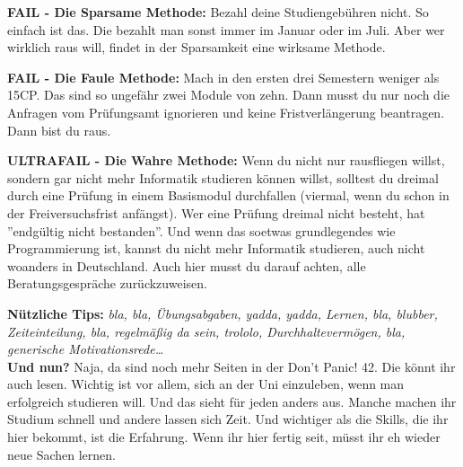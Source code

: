 \textbf{FAIL - Die Sparsame Methode:}
Bezahl deine Studiengeb\"uhren nicht. So einfach ist das. Die bezahlt man sonst immer im Januar oder im Juli. Aber wer wirklich raus will, findet in der Sparsamkeit eine wirksame Methode.

\textbf{FAIL - Die Faule Methode:}
Mach in den ersten drei Semestern weniger als 15CP. Das sind so ungef\"ahr zwei Module von zehn. Dann musst du nur noch die Anfragen vom Pr\"ufungsamt ignorieren und keine Fristverl\"angerung beantragen. Dann bist du raus.

\textbf{ULTRAFAIL - Die Wahre Methode:}
Wenn du nicht nur rausfliegen willst, sondern gar nicht mehr Informatik
studieren k\"onnen willst, solltest du dreimal durch eine Pr\"ufung in einem
Basismodul durchfallen (viermal, wenn du schon in der Freiversuchsfrist
anf\"angst). Wer eine Pr\"ufung dreimal nicht besteht, hat ''endg\"ultig nicht
bestanden''. Und wenn das soetwas grundlegendes wie Programmierung ist, kannst
du nicht mehr Informatik studieren, auch nicht woanders in Deutschland. Auch
hier musst du darauf achten, alle Beratungsgespr\"ache zur\"uckzuweisen.

\textbf{N\"utzliche Tips:}
\emph{bla, bla, \"Ubungsabgaben, yadda, yadda, Lernen, bla, blubber, Zeiteinteilung, bla, regelm\"a{\ss}ig da sein, trololo, Durchhalteverm\"ogen, bla, generische Motivationsrede\dots}\\

\textbf{Und nun?}
Naja, da sind noch mehr Seiten in der Don't Panic! 42. Die k\"onnt ihr auch
lesen. Wichtig ist vor allem, sich an der Uni einzuleben, wenn man erfolgreich
studieren will. Und das sieht f\"ur jeden anders aus. Manche machen ihr Studium
schnell und andere lassen sich Zeit. Und wichtiger als die Skills, die ihr hier
bekommt, ist die Erfahrung. Wenn ihr hier fertig seit, m\"usst ihr eh wieder
neue Sachen lernen.





